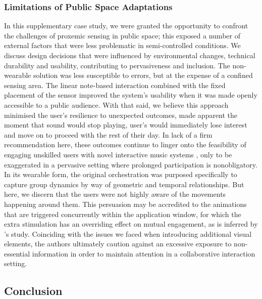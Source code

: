 \subsubsection{Limitations of Public Space Adaptations}

In this supplementary case study, we were granted the opportunity to confront the challenges of proxemic sensing in public space; this exposed a number of external factors that were less problematic in semi-controlled conditions. We discuss design decisions that were influenced by environmental changes, technical durability and usability, contributing to pervasiveness and inclusion. The non-wearable solution was less susceptible to errors, but at the expense of a confined sensing area. The linear note-based interaction combined with the fixed placement of the sensor improved the system's usability when it was made openly accessible to a public audience. With that said, we believe this approach minimised the user's resilience to unexpected outcomes, made apparent the moment that sound would stop playing, user's would immediately lose interest and move on to proceed with the rest of their day. In lack of a firm recommendation here, these outcomes continue to linger onto the feasibility of engaging unskilled users with novel interactive music systems \citep{holland_musical_2019}, only to be exaggerated in a pervasive setting where prolonged participation is nonobligatory. In its wearable form, the original orchestration was purposed specifically to capture group dynamics by way of geometric and temporal relationships. But here, we discern that the users were not highly aware of the movements happening around them. This persuasion may be accredited to the animations that are triggered concurrently within the application window, for which the extra stimulation has an overriding effect on mutual engagement, as is inferred by \citeauthor{bryan-kinns_mutual_2013}'s \citeyear{bryan-kinns_mutual_2013} study. Coinciding with the issues we faced when introducing additional visual elements, the authors ultimately caution against an excessive exposure to non-essential information in order to maintain attention in a collaborative interaction setting.


\subsection{Conclusion}

